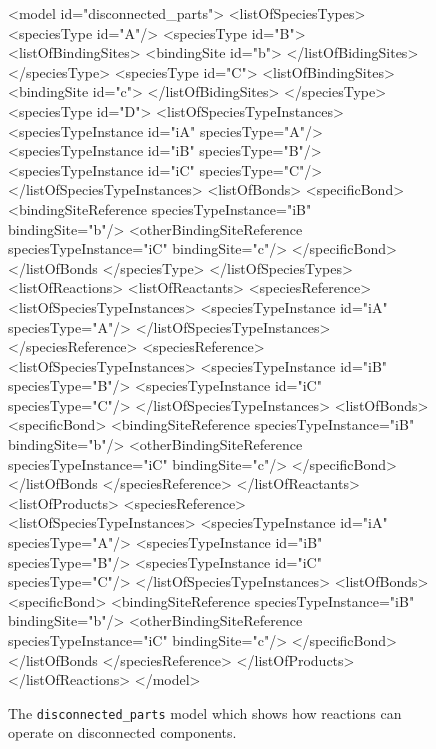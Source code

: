 \documentclass{cekarticle}
\begin{document}
\begin{figure}[h]
\begin{example}
<model id="disconnected_parts">
    <listOfSpeciesTypes>
        <speciesType id="A"/>
        <speciesType id="B">
            <listOfBindingSites>
                <bindingSite id="b">
            </listOfBidingSites>
        </speciesType>
        <speciesType id="C">
            <listOfBindingSites>
                <bindingSite id="c">
            </listOfBidingSites>
        </speciesType>
        <speciesType id="D">
            <listOfSpeciesTypeInstances>
                <speciesTypeInstance id="iA" speciesType="A"/>
                <speciesTypeInstance id="iB" speciesType="B"/>
                <speciesTypeInstance id="iC" speciesType="C"/>
            </listOfSpeciesTypeInstances>
            <listOfBonds>
                <specificBond>
                    <bindingSiteReference speciesTypeInstance="iB" bindingSite="b"/>
                    <otherBindingSiteReference speciesTypeInstance="iC" bindingSite="c"/>
                </specificBond>
            </listOfBonds
        </speciesType>
    </listOfSpeciesTypes>
    <listOfReactions>
        <listOfReactants>
            <speciesReference>
                <listOfSpeciesTypeInstances>
                    <speciesTypeInstance id="iA" speciesType="A"/>
                 </listOfSpeciesTypeInstances>
            </speciesReference>
            <speciesReference>
                <listOfSpeciesTypeInstances>
                    <speciesTypeInstance id="iB" speciesType="B"/>
                    <speciesTypeInstance id="iC" speciesType="C"/>
                </listOfSpeciesTypeInstances>
                <listOfBonds>
                    <specificBond>
                        <bindingSiteReference speciesTypeInstance="iB" bindingSite="b"/>
                        <otherBindingSiteReference speciesTypeInstance="iC" bindingSite="c"/>
                    </specificBond>
                </listOfBonds
            </speciesReference>
        </listOfReactants>
        <listOfProducts>
            <speciesReference>
                <listOfSpeciesTypeInstances>
                    <speciesTypeInstance id="iA" speciesType="A"/>
                    <speciesTypeInstance id="iB" speciesType="B"/>
                    <speciesTypeInstance id="iC" speciesType="C"/>
                </listOfSpeciesTypeInstances>
                <listOfBonds>
                    <specificBond>
                        <bindingSiteReference speciesTypeInstance="iB" bindingSite="b"/>
                        <otherBindingSiteReference speciesTypeInstance="iC" bindingSite="c"/>
                    </specificBond>
                </listOfBonds
            </speciesReference>
        </listOfProducts>
    </listOfReactions>
</model>
\end{example}
  \caption{The \texttt{disconnected\_parts} model which shows how reactions can operate on
  disconnected components.}
  \label{fig:disconnected_parts-xml}
\end{figure}
\end{document}
